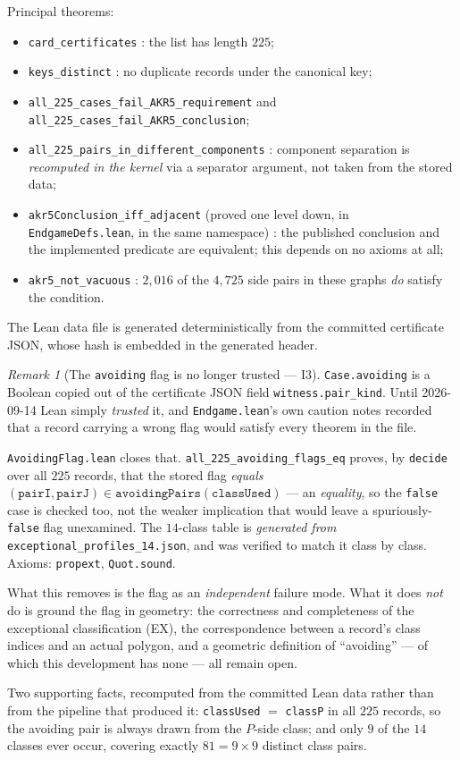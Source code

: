 \documentclass[11pt,a4paper]{article}
\theoremstyle{plain}
\theoremstyle{definition}
\theoremstyle{remark}
\newtheorem*{remark}{Remark}
\begin{document}
Principal theorems:
\begin{itemize}[leftmargin=*,nosep]
  \item \texttt{card\_certificates} : the list has length $225$;
  \item \texttt{keys\_distinct} : no duplicate records under the canonical key;
  \item \texttt{all\_225\_cases\_fail\_AKR5\_requirement} and
    \texttt{all\_225\_cases\_fail\_AKR5\_conclusion};
  \item \texttt{all\_225\_pairs\_in\_different\_components} : component
    separation is \emph{recomputed in the kernel} via a separator argument, not
    taken from the stored data;
  \item \texttt{akr5Conclusion\_iff\_adjacent} (proved one level down, in
    \texttt{EndgameDefs.lean}, in the same namespace) : the published conclusion
    and the implemented predicate are equivalent; this depends on no axioms at
    all;
  \item \texttt{akr5\_not\_vacuous} : $2{,}016$ of the $4{,}725$ side pairs in
    these graphs \emph{do} satisfy the condition.
\end{itemize}
The Lean data file is generated deterministically from the committed certificate
JSON, whose hash is embedded in the generated header.

\begin{remark}[The \texttt{avoiding} flag is no longer trusted --- \textsf{I3}]
\texttt{Case.avoiding} is a Boolean copied out of the certificate JSON field
\texttt{witness.pair\_kind}. Until 2026-09-14 Lean simply \emph{trusted} it, and
\texttt{Endgame.lean}'s own caution notes recorded that a record carrying a wrong
flag would satisfy every theorem in the file.

\texttt{AvoidingFlag.lean} closes that. \texttt{all\_225\_avoiding\_flags\_eq}
proves, by \texttt{decide} over all $225$ records, that the stored flag
\emph{equals} $(\texttt{pairI},\texttt{pairJ}) \in
\texttt{avoidingPairs}(\texttt{classUsed})$ --- an \emph{equality}, so the
\texttt{false} case is checked too, not the weaker implication that would leave a
spuriously-\texttt{false} flag unexamined. The $14$-class table is \emph{generated
from} \texttt{exceptional\_profiles\_14.json}, and was verified to match it
class by class. Axioms: \texttt{propext}, \texttt{Quot.sound}.

What this removes is the flag as an \emph{independent} failure mode. What it does
\emph{not} do is ground the flag in geometry: the correctness and completeness of
the exceptional classification (\textsf{EX}), the correspondence between a
record's class indices and an actual polygon, and a geometric definition of
``avoiding'' --- of which this development has none --- all remain open.

Two supporting facts, recomputed from the committed Lean data rather than from
the pipeline that produced it: \texttt{classUsed} $=$ \texttt{classP} in all
$225$ records, so the avoiding pair is always drawn from the $P$-side class; and
only $9$ of the $14$ classes ever occur, covering exactly $81 = 9\times 9$
distinct class pairs.
\end{remark}
\end{document}
